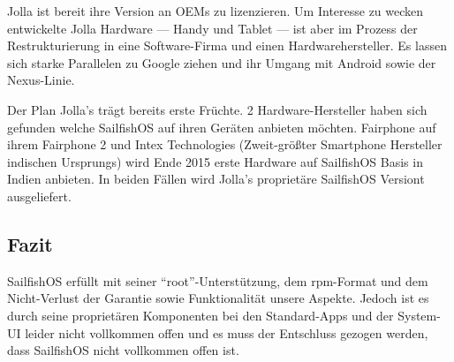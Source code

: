 Jolla ist bereit ihre Version an OEMs zu lizenzieren. Um Interesse zu wecken entwickelte Jolla Hardware --- Handy\cite{online:jolla-smartphone} und Tablet\cite{online:jolla-tablet} --- ist aber im Prozess der Restrukturierung in eine Software-Firma und einen Hardwarehersteller\cite{online:jolla-googlelike}. Es lassen sich starke Parallelen zu Google ziehen und ihr Umgang mit Android sowie der Nexus-Linie.

Der Plan Jolla's trägt bereits erste Früchte. 2 Hardware-Hersteller haben sich gefunden welche \mbox{SailfishOS} auf ihren Geräten anbieten möchten. Fairphone auf ihrem Fairphone 2\cite{online:jolla-fairphone2} und Intex Technologies (Zweit-größter Smartphone Hersteller indischen Ursprungs) wird Ende 2015 erste Hardware auf \mbox{SailfishOS} Basis in Indien anbieten\cite{online:jolla-intex-pdf}. In beiden Fällen wird Jolla's proprietäre \mbox{SailfishOS} Versiont ausgeliefert.\\

\subsection{Fazit}
\mbox{SailfishOS} erfüllt mit seiner \mbox{``root''-Unterstützung}, dem rpm-Format und dem Nicht-Verlust der Garantie sowie Funktionalität unsere Aspekte. Jedoch ist es durch seine proprietären Komponenten bei den \mbox{Standard-Apps} und der \mbox{System-UI} leider nicht vollkommen offen und es muss der Entschluss gezogen werden, dass \mbox{SailfishOS} nicht vollkommen offen ist.